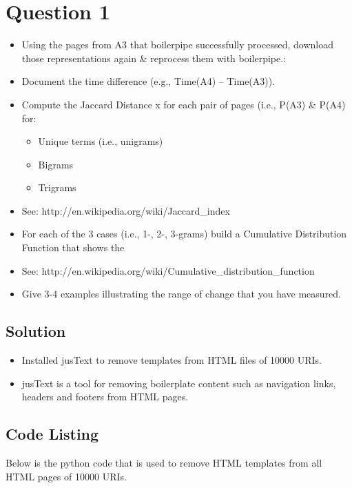 


\section{Question 1}
\label{part1}

\begin{itemize}
\item Using the pages from A3 that boilerpipe successfully processed, download those representations again & reprocess them with boilerpipe.:
\item Document the time difference (e.g., Time(A4) – Time(A3)).
\item Compute the Jaccard Distance x for each pair of pages (i.e., P(A3) & P(A4) for:
 \begin{itemize}
\item Unique terms (i.e., unigrams)
\item Bigrams
\item Trigrams
\end{itemize}
\item See: http://en.wikipedia.org/wiki/Jaccard_index 
\item For each of the 3 cases (i.e., 1-, 2-, 3-grams) build a Cumulative Distribution Function that shows the %
\item See: http://en.wikipedia.org/wiki/Cumulative_distribution_function
\item Give 3-4 examples illustrating the range of change that you have measured.
\end{itemize}
\subsection{Solution}

\begin{itemize}
	\item Installed jusText\cite{jusText} to remove templates from HTML files of 10000 URIs.
	\item jusText is a tool for removing boilerplate content such as navigation links, headers and footers from HTML pages.
\end{itemize}

 \subsection{Code Listing}
Below is the python code that is used to remove HTML templates from all HTML pages of 10000 URIs.

